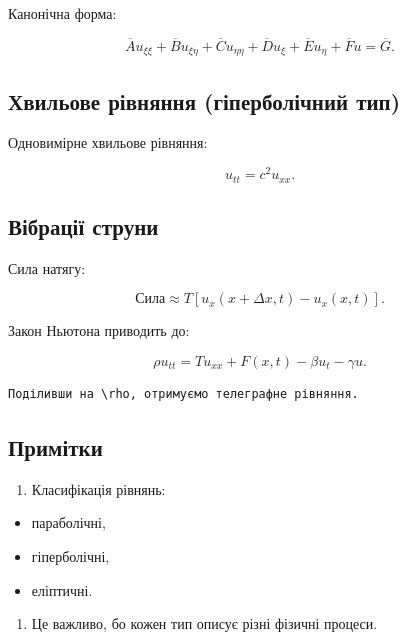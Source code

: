 \documentclass[
  ukrainian,
]{article}
\providecommand{\tightlist}{%
  \setlength{\itemsep}{0pt}\setlength{\parskip}{0pt}}
\begin{document}
Канонічна форма:

\[
\overline{A}u_{\xi\xi} + \overline{B}u_{\xi\eta} + \overline{C}u_{\eta\eta} + \overline{D}u_{\xi} + \overline{E}u_{\eta} + \overline{F}u = \overline{G}.
\]

\subsection{Хвильове рівняння (гіперболічний
тип)}\label{ux445ux432ux438ux43bux44cux43eux432ux435-ux440ux456ux432ux43dux44fux43dux43dux44f-ux433ux456ux43fux435ux440ux431ux43eux43bux456ux447ux43dux438ux439-ux442ux438ux43f}

Одновимірне хвильове рівняння:

\[
u_{tt} = c^2 u_{xx}.
\]

\subsection{Вібрації
струни}\label{ux432ux456ux431ux440ux430ux446ux456ux457-ux441ux442ux440ux443ux43dux438}

Сила натягу:

\[
\text{Сила} \approx T \left[ u_x(x + \Delta x, t) - u_x(x, t) \right].
\]

Закон Ньютона приводить до:

\[
\rho u_{tt} = T u_{xx} + F(x,t) - \beta u_t - \gamma u.
\]

\begin{verbatim}
Поділивши на \rho, отримуємо телеграфне рівняння.
\end{verbatim}

\subsection{Примітки}\label{ux43fux440ux438ux43cux456ux442ux43aux438-2}

\begin{enumerate}
\def\labelenumi{\arabic{enumi}.}
\tightlist
\item
  Класифікація рівнянь:
\end{enumerate}

\begin{itemize}
\item
  параболічні,
\item
  гіперболічні,
\item
  еліптичні.
\end{itemize}

\begin{enumerate}
\def\labelenumi{\arabic{enumi}.}
\setcounter{enumi}{1}
\tightlist
\item
  Це важливо, бо кожен тип описує різні фізичні процеси.
\end{enumerate}
\end{document}
